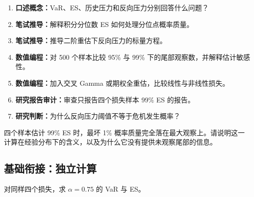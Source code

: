 \begin{enumerate}[leftmargin=*]
  \item \textbf{口述概念：}VaR、ES、历史压力和反向压力分别回答什么问题？
  \item \textbf{笔试推导：}解释积分分位数 ES 如何处理分位点概率质量。
  \item \textbf{笔试推导：}推导二阶重估下反向压力的标量方程。
  \item \textbf{数值编程：}对 500 个样本比较 95\% 与 99\% 下的尾部观察数，并解释估计敏感性。
  \item \textbf{数值编程：}加入交叉 Gamma 或期权全重估，比较线性与非线性损失。
  \item \textbf{研究报告审计：}审查只报告四个损失样本 99\% ES 的报告。
  \item \textbf{研究判断：}为什么反向压力阈值不等于危机发生概率？
\end{enumerate}

四个样本估计 99\% ES 时，最坏 1\% 概率质量完全落在最大观察上。请说明这一计算在经验分布下的含义，以及为什么它没有提供未观察尾部的信息。
\subsection*{基础衔接：独立计算}
对同样四个损失，求 $\alpha=0.75$ 的 VaR 与 ES。
